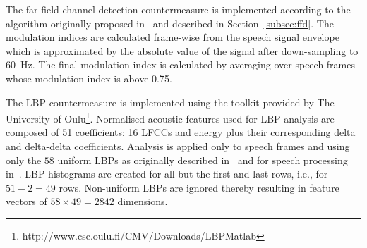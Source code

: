 
The far-field channel detection countermeasure is implemented according to the algorithm originally proposed in~\cite{Villalba2011} and described in Section~\ref{subsec:ffd}. The modulation indices are calculated frame-wise from the speech signal envelope which is approximated by the absolute value of the signal after down-sampling to 60~Hz.  The final modulation index is calculated by averaging over speech frames whose modulation index is above 0.75.  


The LBP countermeasure is implemented using the toolkit provided by The University of Oulu\footnote{http://www.cse.oulu.fi/CMV/Downloads/LBPMatlab}.
Normalised acoustic features used for LBP analysis are composed of 51 coefficients: 16 LFCCs and energy plus their corresponding delta and delta-delta coefficients.  Analysis is applied only to speech frames and using only the $58$  uniform LBPs as originally described in~\cite{Ojala2002} and for speech processing in~\cite{Alegre2013a}.  %
LBP histograms are created for all but the first and last rows, i.e., for $51 - 2 = 49$ rows.  Non-uniform LBPs are ignored thereby resulting in feature vectors of $58 \times 49 = 2842$ dimensions. 


